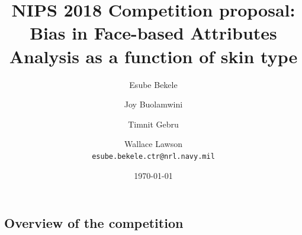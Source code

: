 \documentclass[11pt, oneside]{article}
\title{NIPS 2018 Competition proposal: Bias in Face-based Attributes Analysis
 as a function of skin type}
\author{Esube Bekele
		\and Joy Buolamwini \and Timnit Gebru \and Wallace
	 Lawson \\
{\tt esube.bekele.ctr@nrl.navy.mil}\\
}
\date{\today}
\begin{document}
\maketitle


\subsection{Overview of the competition}
\end{document}
